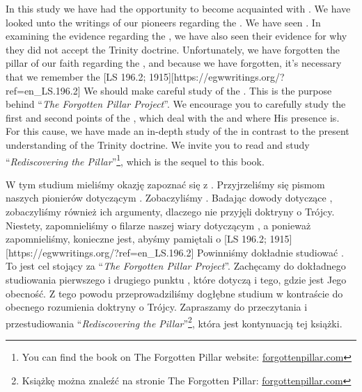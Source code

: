 In this study we have had the opportunity to become acquainted with . We have looked unto the writings of our pioneers regarding the . We have seen . In examining the evidence regarding the , we have also seen their evidence for why they did not accept the Trinity doctrine. Unfortunately, we have forgotten the pillar of our faith regarding the , and because we have forgotten, it’s necessary that we remember the [LS 196.2; 1915][https://egwwritings.org/?ref=en\_LS.196.2] We should make careful study of the . This is the purpose behind “\textit{The Forgotten Pillar Project}”. We encourage you to carefully study the first and second points of the , which deal with the  and where His presence is. For this cause, we have made an in-depth study of the  in contrast to the present understanding of the Trinity doctrine. We invite you to read and study “\textit{Rediscovering the Pillar}”\footnote{You can find the book on The Forgotten Pillar website: \href{http://forgottenpillar.com}{forgottenpillar.com}}, which is the sequel to this book.


W tym studium mieliśmy okazję zapoznać się z . Przyjrzeliśmy się pismom naszych pionierów dotyczącym . Zobaczyliśmy . Badając dowody dotyczące , zobaczyliśmy również ich argumenty, dlaczego nie przyjęli doktryny o Trójcy. Niestety, zapomnieliśmy o filarze naszej wiary dotyczącym , a ponieważ zapomnieliśmy, konieczne jest, abyśmy pamiętali o [LS 196.2; 1915][https://egwwritings.org/?ref=en\_LS.196.2] Powinniśmy dokładnie studiować . To jest cel stojący za “\textit{The Forgotten Pillar Project}”. Zachęcamy do dokładnego studiowania pierwszego i drugiego punktu , które dotyczą  i tego, gdzie jest Jego obecność. Z tego powodu przeprowadziliśmy dogłębne studium  w kontraście do obecnego rozumienia doktryny o Trójcy. Zapraszamy do przeczytania i przestudiowania “\textit{Rediscovering the Pillar}”\footnote{Książkę można znaleźć na stronie The Forgotten Pillar: \href{http://forgottenpillar.com}{forgottenpillar.com}}, która jest kontynuacją tej książki.




% 